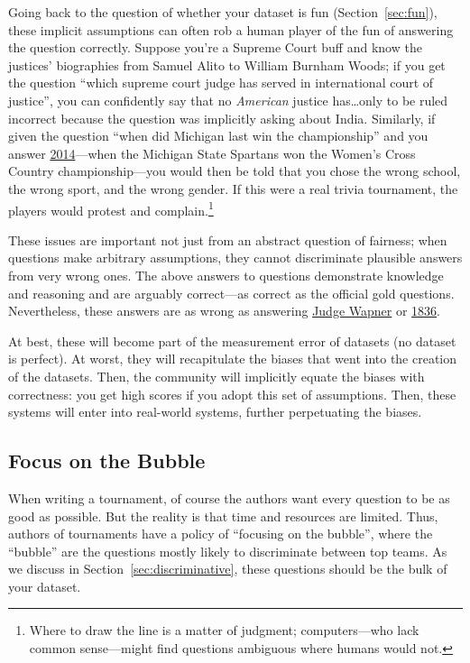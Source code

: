 Going back to the question of whether your dataset is fun (Section~\ref{sec:fun}), these implicit assumptions can often rob a human player of the fun of answering the question correctly.
Suppose you're a  Supreme Court buff and know the justices' biographies from Samuel Alito to William Burnham Woods; if you get the question ``which supreme court judge has served in international court of justice'', you can confidently say that no \emph{American} justice has\dots only to be ruled incorrect because the question was implicitly asking about India.
Similarly, if given the question ``when did Michigan last win the championship'' and you answer \underline{2014}---when the Michigan State Spartans won the Women's Cross Country championship---you would then be told that you chose the wrong school, the wrong sport, and the wrong gender.
If this were a real trivia tournament, the players would protest and complain.\footnote{Where to draw the line is a matter of judgment; computers---who lack common sense---might find questions ambiguous where humans would not.}

These issues are important not just from an abstract question of fairness; when questions make arbitrary assumptions, they cannot discriminate plausible answers from very wrong ones.
The above answers to questions demonstrate knowledge and reasoning and are arguably correct---as correct as the official gold questions.
Nevertheless, these answers are as wrong as answering \underline{Judge Wapner} or \underline{1836}.

At best, these will become part of the measurement error of datasets (no dataset is perfect). 
At worst, they will recapitulate the biases that went into the creation of the datasets.
Then, the community will implicitly equate the biases with correctness: you get high scores if you adopt this set of assumptions.
Then, these systems will enter into real-world systems, further perpetuating the biases.

\subsection{Focus on the Bubble}

When writing a tournament, of course the authors want every question to be as good as possible.
But the reality is that time and resources are limited.  
Thus, authors of tournaments have a policy of ``focusing on the bubble'', where the ``bubble'' are the questions mostly likely to discriminate between top teams.
As we discuss in Section~\ref{sec:discriminative}, these questions should be the bulk of your dataset.

